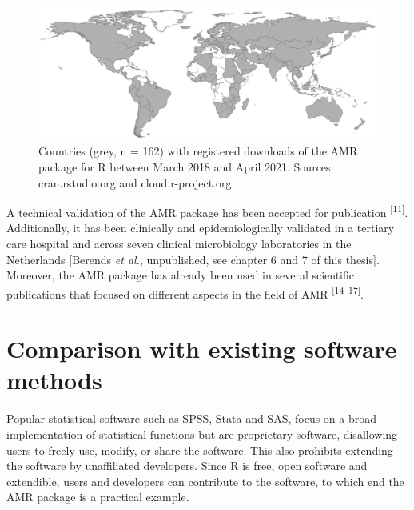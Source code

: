\documentclass[
]{book}
\begin{document}
\begin{figure}

{\centering \includegraphics[width=1\linewidth]{images/03-01} 

}

\caption{Countries (grey, n = 162) with registered downloads of the AMR package for R between March 2018 and April 2021. Sources: cran.rstudio.org and cloud.r-project.org.}\label{fig:fig3-1}
\end{figure}

A technical validation of the AMR package has been accepted for publication \textsuperscript{{[}11{]}}. Additionally, it has been clinically and epidemiologically validated in a tertiary care hospital and across seven clinical microbiology laboratories in the Netherlands {[}Berends \emph{et al.}, unpublished, see chapter 6 and 7 of this thesis{]}. Moreover, the AMR package has already been used in several scientific publications that focused on different aspects in the field of AMR \textsuperscript{{[}14--17{]}}.

\hypertarget{comparison-with-existing-software-methods}{%
\section{Comparison with existing software methods}\label{comparison-with-existing-software-methods}}

Popular statistical software such as SPSS, Stata and SAS, focus on a broad implementation of statistical functions but are proprietary software, disallowing users to freely use, modify, or share the software. This also prohibits extending the software by unaffiliated developers. Since R is free, open software and extendible, users and developers can contribute to the software, to which end the AMR package is a practical example.
\end{document}
